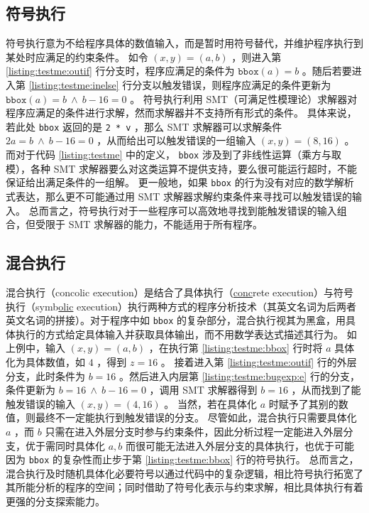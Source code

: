\subsection{符号执行}

符号执行\cite{symbexe}意为不给程序具体的数值输入，而是暂时用符号替代，并维护程序执行到某处时应满足的约束条件。
如令 $(x, y) = (a, b)$ ，则进入第 \ref{listing:testme:outif} 行分支时，程序应满足的条件为 $\texttt{bbox}(a) = b$ 。随后若要进入第 \ref{listing:testme:inelse} 行分支以触发错误，则程序应满足的条件更新为 $\texttt{bbox}(a) = b ~\wedge~ b - 16 = 0$ 。
符号执行利用 SMT（可满足性模理论）求解器对程序应满足的条件进行求解，然而求解器并不支持所有形式的条件。
具体来说，若此处 \texttt{bbox} 返回的是 \texttt{2 * v} ，那么 SMT 求解器可以求解条件 $2a = b ~\wedge~ b - 16 = 0$ ，从而给出可以触发错误的一组输入 $(x, y) = (8, 16)$ 。
而对于代码 \ref{listing:testme} 中的定义， \texttt{bbox} 涉及到了非线性运算（乘方与取模），各种 SMT 求解器要么对这类运算不提供支持，要么很可能运行超时，不能保证给出满足条件的一组解。
更一般地，如果 \texttt{bbox} 的行为没有对应的数学解析式表达，那么更不可能通过用 SMT 求解器求解约束条件来寻找可以触发错误的输入。
总而言之，符号执行对于一些程序可以高效地寻找到能触发错误的输入组合，但受限于 SMT 求解器的能力，不能适用于所有程序。

\subsection{混合执行}

混合执行（concolic execution）\cite{dart, cute}是结合了具体执行（\underline{conc}rete execution）与符号执行（symb\underline{olic} execution）执行两种方式的程序分析技术（其英文名词为后两者英文名词的拼接）。对于程序中如 \texttt{bbox} 的复杂部分，混合执行视其为黑盒，用具体执行的方式给定具体输入并获取具体输出，而不用数学表达式描述其行为。
如上例中，输入 $(x, y) = (a, b)$ ，在执行第 \ref{listing:testme:bbox} 行时将 $a$ 具体化为具体数值，如 $4$ ，得到 $z = 16$ 。
接着进入第 \ref{listing:testme:outif} 行的外层分支，此时条件为 $b = 16$ 。然后进入内层第 \ref{listing:testme:bugexp:e} 行的分支，条件更新为 $b = 16 ~\wedge~ b - 16 = 0$ ，调用 SMT 求解器得到 $b = 16$ ，从而找到了能触发错误的输入 $(x, y) = (4, 16)$ 。
当然，若在具体化 $a$ 时赋予了其别的数值，则最终不一定能执行到触发错误的分支。
尽管如此，混合执行只需要具体化 $a$ ，而 $b$ 只需在进入外层分支时参与约束条件，因此分析过程一定能进入外层分支，优于需同时具体化 $a, b$ 而很可能无法进入外层分支的具体执行，也优于可能因为 \texttt{bbox} 的复杂性而止步于第 \ref{listing:testme:bbox} 行的符号执行。
总而言之，混合执行及时随机具体化必要符号以通过代码中的复杂逻辑，相比符号执行拓宽了其所能分析的程序的空间；同时借助了符号化表示与约束求解，相比具体执行有着更强的分支探索能力。

